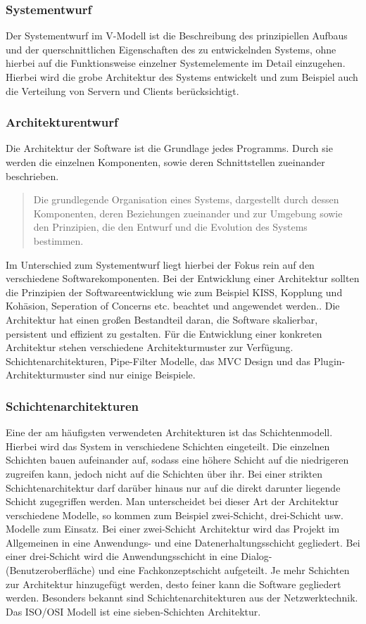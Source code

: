 \subsubsection{Systementwurf}
Der Systementwurf im V-Modell ist die Beschreibung des prinzipiellen Aufbaus und der querschnittlichen Eigenschaften des zu entwickelnden Systems, ohne hierbei auf die Funktionsweise einzelner Systemelemente im Detail einzugehen\cite{ITBeauftragterderBundesregierung.2005}. Hierbei wird die grobe Architektur des Systems entwickelt und zum Beispiel auch die Verteilung von Servern und Clients berücksichtigt.
\subsubsection{Architekturentwurf}
Die Architektur der Software ist die Grundlage jedes Programms. Durch sie werden die einzelnen Komponenten, sowie deren Schnittstellen zueinander beschrieben.
\begin{quote} \dq Die grundlegende Organisation eines Systems, dargestellt durch dessen Komponenten, deren Beziehungen zueinander und zur Umgebung sowie den Prinzipien, die den Entwurf und die Evolution des Systems bestimmen.\dq~ ~\cite{WilhelmHasselbring.2006}\end{quote} Im Unterschied zum Systementwurf liegt hierbei der Fokus rein auf den verschiedene Softwarekomponenten.
Bei der Entwicklung einer Architektur sollten die Prinzipien der Softwareentwicklung wie zum Beispiel KISS, Kopplung und Kohäsion, Seperation of Concerns etc. beachtet und angewendet werden.\cite{Broy.2021}. Die Architektur hat einen großen Bestandteil daran, die Software skalierbar, persistent und effizient zu gestalten.
 Für die Entwicklung einer konkreten Architektur stehen verschiedene Architekturmuster zur Verfügung. Schichtenarchitekturen, Pipe-Filter Modelle, das MVC Design und das Plugin-Architekturmuster sind nur einige Beispiele.
\subsubsection*{Schichtenarchitekturen}
Eine der am häufigsten verwendeten Architekturen ist das Schichtenmodell.\cite{Prof.Dr.WolfgangSchramm.2009} Hierbei wird das System in verschiedene Schichten eingeteilt. Die einzelnen Schichten bauen aufeinander auf, sodass eine höhere Schicht auf die niedrigeren zugreifen kann, jedoch nicht auf die Schichten über ihr. Bei einer strikten Schichtenarchitektur darf darüber hinaus nur auf die direkt darunter liegende Schicht zugegriffen werden. Man unterscheidet bei dieser Art der Architektur verschiedene Modelle, so kommen zum Beispiel zwei-Schicht, drei-Schicht usw. Modelle zum Einsatz. Bei einer zwei-Schicht Architektur wird das Projekt im Allgemeinen in eine Anwendungs- und eine Datenerhaltungsschicht gegliedert. Bei einer drei-Schicht wird die Anwendungsschicht in eine Dialog- (Benutzeroberfläche) und eine Fachkonzeptschicht aufgeteilt. Je mehr Schichten zur Architektur hinzugefügt werden, desto feiner kann die Software gegliedert werden.\cite{Prof.Dr.WolfgangSchramm.2009} Besonders bekannt sind Schichtenarchitekturen aus der Netzwerktechnik. Das ISO/OSI Modell ist eine sieben-Schichten Architektur. 
